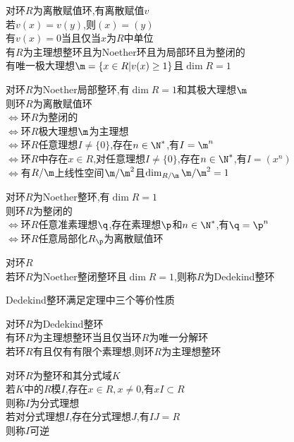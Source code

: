 \begin{dingli}
对环$R$为离散赋值环,有离散赋值$v$\\
若$v(x)=v(y)$,则$(x)=(y)$\\
有$v(x)=0$当且仅当$x$为$R$中单位\\
有$R$为主理想整环且为Noether环且为局部环且为整闭的\\
有唯一极大理想$\m=\{x\in R|v(x)\geq 1\}$且$\dim R=1$
\end{dingli}

\begin{dingli}
对环$R$为Noether局部整环,有$\dim R=1$和其极大理想$\m$\\
则环$R$为离散赋值环\\
$\Leftrightarrow$环$R$为整闭的\\
$\Leftrightarrow$环$R$极大理想$\m$为主理想\\
$\Leftrightarrow$环$R$任意理想$I\neq\{0\}$,存在$n\in \N^*$,有$I=\m^n$\\
$\Leftrightarrow$环$R$中存在$x\in R$,对任意理想$I\neq\{0\}$,存在$n\in \N^*$,有$I=(x^n)$\\
$\Leftrightarrow$有$R/\m$上线性空间$\m/\m^2$且$\dim_{R/\m}\m/\m^2=1$
\end{dingli}

\begin{dingli}
对环$R$为Noether整环,有$\dim R=1$\\
则环$R$为整闭的\\
$\Leftrightarrow$环$R$任意准素理想$\q$,存在素理想$\p$和$n\in\N^*$,有$\q=\p^n$\\
$\Leftrightarrow$环$R$任意局部化$R_{\p}$为离散赋值环
\end{dingli}

\begin{dingli}
对环$R$\\
若环$R$为Noether整闭整环且$\dim R=1$,则称$R$为Dedekind整环
\end{dingli}

\begin{zhu}
Dedekind整环满足定理中三个等价性质
\end{zhu}

\begin{dingli}
对环$R$为Dedekind整环\\
有环$R$为主理想整环当且仅当环$R$为唯一分解环\\
若环$R$有且仅有有限个素理想,则环$R$为主理想整环
\end{dingli}

\begin{dingli}
对环$R$为整环和其分式域$K$\\
若$K$中的$R$模$I$,存在$x\in R,x\neq 0$,有$xI\subset R$\\
则称$I$为分式理想\\
若对分式理想$I$,存在分式理想$J$,有$IJ=R$\\
则称$I$可逆
\end{dingli}

